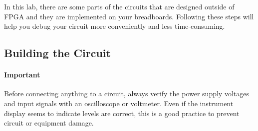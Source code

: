 \documentclass[12pt, logo=tehranDLDL/ut]{tehranDLDL}
\begin{document}
In this lab, there are some parts of the circuits that are designed outside of FPGA and they are implemented on your breadboards. Following these steps will help you debug your circuit more conveniently and less time-consuming. 

\subsection{Building the Circuit\label{sec:building-circuit}}

\paragraph*{Important}
Before connecting anything to a circuit, always verify the power supply voltages and input signals with an oscilloscope or voltmeter. Even if the instrument display seems to indicate levels are correct, this is a good practice to prevent circuit or equipment damage.
\end{document}
